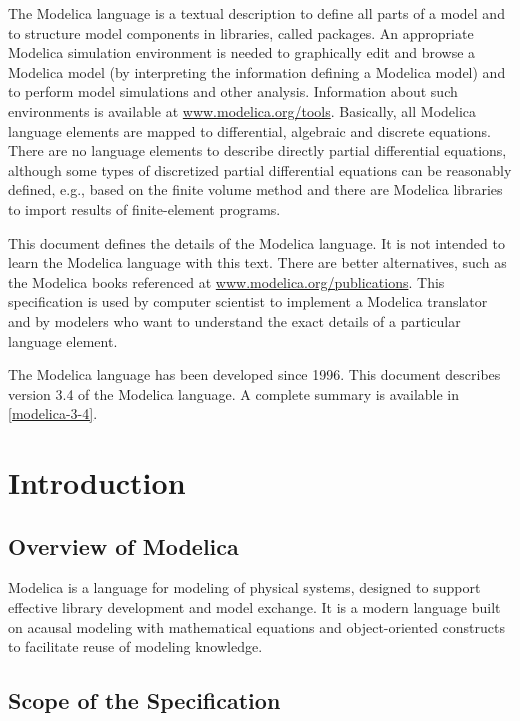\documentclass[10pt,a4paper]{report}
\def\doublelabel#1{\label{#1}}
\begin{document}
The Modelica language is a textual description to define all parts of a
model and to structure model components in libraries, called packages.
An appropriate Modelica simulation environment is needed to graphically
edit and browse a Modelica model (by interpreting the information
defining a Modelica model) and to perform model simulations and other
analysis. Information about such environments is available at
\href{http://www.modelica.org/tools}{www.modelica.org/tools}. Basically,
all Modelica language elements are mapped to differential, algebraic and
discrete equations. There are no language elements to describe directly
partial differential equations, although some types of discretized
partial differential equations can be reasonably defined, e.g., based on
the finite volume method and there are Modelica libraries to import
results of finite-element programs.

This document defines the details of the Modelica language. It is not
intended to learn the Modelica language with this text. There are better
alternatives, such as the Modelica books referenced at
\href{http://www.modelica.org/publications}{www.modelica.org/publications}.
This specification is used by computer scientist to implement a Modelica
translator and by modelers who want to understand the exact details of a
particular language element.

The Modelica language has been developed since 1996. This document
describes version 3.4 of the Modelica language. A complete summary is
available in \ref{modelica-3-4}.

\chapter{Introduction}\doublelabel{introduction1}
\section{Overview of Modelica}\doublelabel{overview-of-modelica}
Modelica is a language for modeling of physical systems, designed to
support effective library development and model exchange. It is a modern
language built on acausal modeling with mathematical equations and
object-oriented constructs to facilitate reuse of modeling knowledge.

\section{Scope of the Specification}\doublelabel{scope-of-the-specification}
\end{document}

